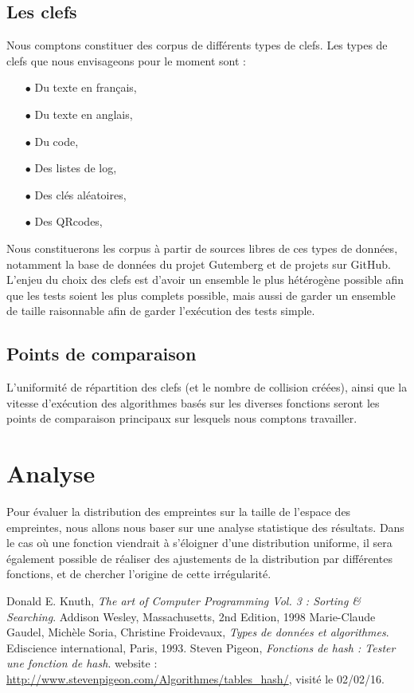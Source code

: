 \documentclass[final,twoside,article,10pt]{scrartcl}
\begin{document}
	\subsection{Les clefs}
		Nous comptons constituer des corpus de différents types de clefs. Les types de clefs que nous envisageons pour le moment sont :
		\begin{itemize}
			\item[$\bullet$]Du texte en français,
			\item[$\bullet$]Du texte en anglais,
			\item[$\bullet$]Du code,
			\item[$\bullet$]Des listes de log,
			\item[$\bullet$]Des clés aléatoires,
			\item[$\bullet$]Des QRcodes,
		\end{itemize}
		Nous constituerons les corpus à partir de sources libres de ces types de données, notamment la base de données du projet Gutemberg et de projets sur GitHub. L'enjeu du choix des clefs est d'avoir un ensemble le plus hétérogène possible afin que les tests soient les plus complets possible, mais aussi de garder un ensemble de taille raisonnable afin de garder l'exécution des tests simple.
		
	\subsection{Points de comparaison}
		L'uniformité de répartition des clefs (et le nombre de collision créées), ainsi que la vitesse d'exécution des algorithmes basés sur les diverses fonctions seront les points de comparaison principaux sur lesquels nous comptons travailler.

\section{Analyse}
	Pour évaluer la distribution des empreintes sur la taille de l'espace des empreintes, nous allons nous baser sur une analyse statistique des résultats. Dans le cas où une fonction viendrait à s'éloigner d'une distribution uniforme, il sera également possible de réaliser des ajustements de la distribution par différentes fonctions, et de chercher l'origine de cette irrégularité.


\begin{thebibliography}{9}
        Donald E. Knuth,
        \emph{The art of Computer Programming \small{Vol. 3 : Sorting \& Searching}}.
                                Addison Wesley, Massachusetts,
                                    2nd Edition,
                                        1998
        Marie-Claude Gaudel, Michèle Soria, Christine Froidevaux,
            \emph{Types de données et algorithmes}. Ediscience international, Paris,
                                                        1993.
        Steven Pigeon,
            \emph{Fonctions de hash : Tester une fonction de hash}.
                            website : \url{http://www.stevenpigeon.com/Algorithmes/tables_hash/}, visité le 02/02/16.
\end{thebibliography}
\end{document}
